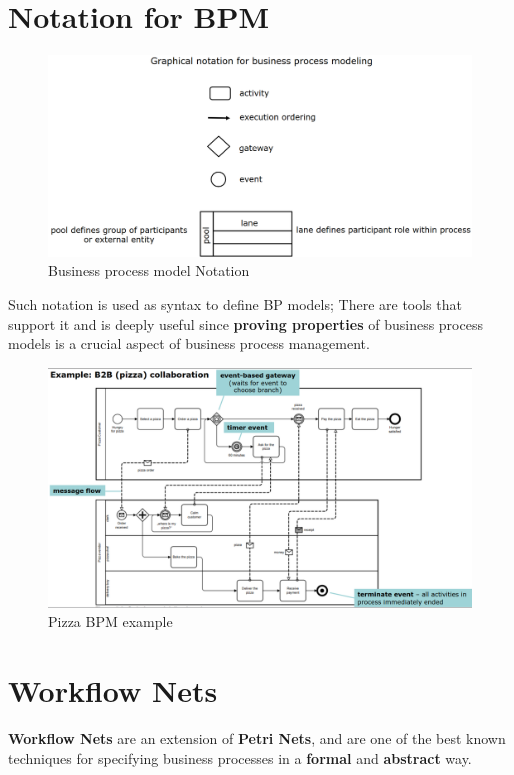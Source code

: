 \section{Notation for BPM}
\begin{figure}[htbp]
   \centering
   \includegraphics{images/bpm_notation.png}
   \caption{Business process model Notation}
   \label{fig:bpm_notation}
\end{figure}
Such notation is used as syntax to define BP models;
There are tools that support it and is deeply useful since \textbf{proving properties} of
business process models is a crucial aspect of business process management.

\begin{figure}[htbp]
   \centering
   \includegraphics{images/bpm_pizza.png}
   \caption{Pizza BPM example}
   \label{fig:bpm_pizza}
\end{figure}

\section{Workflow Nets}
\textbf{Workflow Nets} are an extension of \textbf{Petri Nets}, and are one of the best known techniques for specifying business processes in a \textbf{formal} and \textbf{abstract} way.

